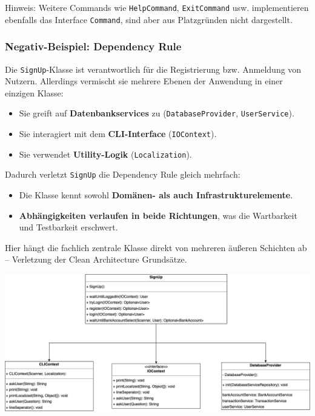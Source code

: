 Hinweis: Weitere Commands wie \texttt{HelpCommand}, \texttt{ExitCommand} usw. implementieren ebenfalls das Interface \texttt{Command}, sind aber aus Platzgründen nicht dargestellt.

\subsubsection*{Negativ-Beispiel: Dependency Rule}
Die \texttt{SignUp}-Klasse ist verantwortlich für die Registrierung bzw. Anmeldung von Nutzern. Allerdings vermischt sie mehrere Ebenen der Anwendung in einer einzigen Klasse:
\begin{itemize}
    \item Sie greift auf \textbf{Datenbankservices} zu (\texttt{DatabaseProvider}, \texttt{UserService}).
    \item Sie interagiert mit dem \textbf{CLI-Interface} (\texttt{IOContext}).
    \item Sie verwendet \textbf{Utility-Logik} (\texttt{Localization}).
\end{itemize}
Dadurch verletzt \texttt{SignUp} die Dependency Rule gleich mehrfach:
\begin{itemize}
    \item Die Klasse kennt sowohl \textbf{Domänen- als auch Infrastrukturelemente}.
    \item \textbf{Abhängigkeiten verlaufen in beide Richtungen}, was die Wartbarkeit und Testbarkeit erschwert.
\end{itemize}

Hier hängt die fachlich zentrale Klasse direkt von mehreren äußeren Schichten ab – Verletzung der Clean Architecture Grundsätze.

\includegraphics[width=\linewidth]{kapitel2_architektur/DepRulNeg.png}